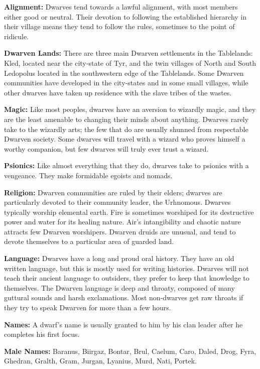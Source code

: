 \documentclass[10pt,a4paper,twocolumn]{d20}
\begin{document}
\textbf{Alignment:} Dwarves tend towards a lawful alignment, with most members either good or neutral. Their devotion to following the established hierarchy in their village means they tend to follow the rules, sometimes to the point of ridicule.

\textbf{Dwarven Lands:} There are three main Dwarven settlements in the Tablelands: Kled, located near the city‐state of Tyr, and the twin villages of North and South Ledopolus located in the southwestern edge of the Tablelands. Some Dwarven communities have developed in the city‐states and in some small villages, while other dwarves have taken up residence with the slave tribes of the wastes.

\textbf{Magic:} Like most peoples, dwarves have an aversion to wizardly magic, and they are the least amenable to changing their minds about anything. Dwarves rarely take to the wizardly arts; the few that do are usually shunned from respectable Dwarven society. Some dwarves will travel with a wizard who proves himself a worthy companion, but few dwarves will truly ever trust a wizard.

\textbf{Psionics:} Like almost everything that they do, dwarves take to psionics with a vengeance. They make formidable egoists and nomads.

\textbf{Religion:} Dwarven communities are ruled by their elders; dwarves are particularly devoted to their community leader, the Urhnomous. Dwarves typically worship elemental earth. Fire is sometimes worshiped for its destructive power and water for its healing nature. Air’s intangibility and chaotic nature attracts few Dwarven worshipers. Dwarven druids are unusual, and tend to devote themselves to a particular area of guarded land.

\textbf{Language:} Dwarves have a long and proud oral history. They have an old written language, but this is mostly used for writing histories. Dwarves will not teach their ancient language to outsiders, they prefer to keep that knowledge to themselves. The Dwarven language is deep and throaty, composed of many guttural sounds and harsh exclamations. Most non‐dwarves get raw throats if they try to speak Dwarven for more than a few hours.

\textbf{Names:} A dwarf’s name is usually granted to him by his clan leader after he completes his first focus.

\textbf{Male Names:} Baranus, Biirgaz, Bontar, Brul, Caelum, Caro, Daled, Drog, Fyra, Ghedran, Gralth, Gram, Jurgan, Lyanius, Murd, Nati, Portek.
\end{document}
